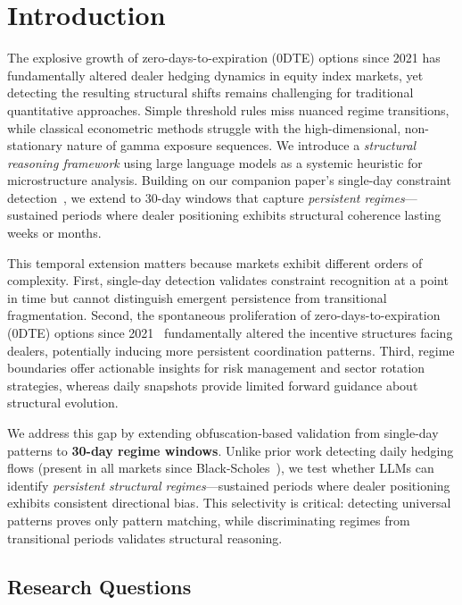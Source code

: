 \section{Introduction}

The explosive growth of zero-days-to-expiration (0DTE) options since 2021 has fundamentally altered dealer hedging dynamics in equity index markets, yet detecting the resulting structural shifts remains challenging for traditional quantitative approaches. Simple threshold rules miss nuanced regime transitions, while classical econometric methods struggle with the high-dimensional, non-stationary nature of gamma exposure sequences. We introduce a \textit{structural reasoning framework} using large language models as a systemic heuristic for microstructure analysis. Building on our companion paper's single-day constraint detection~\citep{regan2025obfuscation}, we extend to 30-day windows that capture \textit{persistent regimes}—sustained periods where dealer positioning exhibits structural coherence lasting weeks or months.

This temporal extension matters because markets exhibit different orders of complexity. First, single-day detection validates constraint recognition at a point in time but cannot distinguish emergent persistence from transitional fragmentation. Second, the spontaneous proliferation of zero-days-to-expiration (0DTE) options since 2021~\citep{cboe2024zero,dim2025zero} fundamentally altered the incentive structures facing dealers, potentially inducing more persistent coordination patterns. Third, regime boundaries offer actionable insights for risk management and sector rotation strategies, whereas daily snapshots provide limited forward guidance about structural evolution.

We address this gap by extending obfuscation-based validation from single-day patterns to \textbf{30-day regime windows}. Unlike prior work detecting daily hedging flows (present in all markets since Black-Scholes~\citep{black1973pricing}), we test whether LLMs can identify \textit{persistent structural regimes}—sustained periods where dealer positioning exhibits consistent directional bias. This selectivity is critical: detecting universal patterns proves only pattern matching, while discriminating regimes from transitional periods validates structural reasoning.

\subsection{Research Questions}


